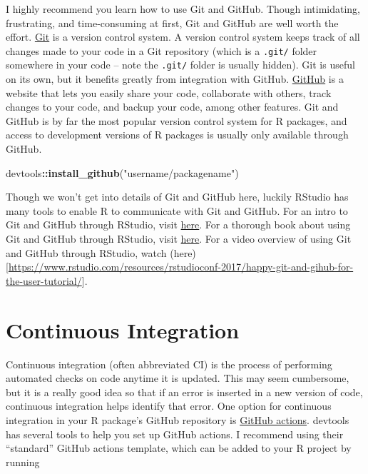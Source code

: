 \documentclass[
]{book}
\newenvironment{Shaded}{\begin{snugshade}}{\end{snugshade}}
\newcommand{\KeywordTok}[1]{\textcolor[rgb]{0.13,0.29,0.53}{\textbf{#1}}}
\newcommand{\NormalTok}[1]{#1}
\newcommand{\OperatorTok}[1]{\textcolor[rgb]{0.81,0.36,0.00}{\textbf{#1}}}
\newcommand{\StringTok}[1]{\textcolor[rgb]{0.31,0.60,0.02}{#1}}
\begin{document}
I highly recommend you learn how to use Git and GitHub. Though intimidating, frustrating, and time-consuming at first, Git and GitHub are well worth the effort. \href{https://git-scm.com/}{Git} is a version control system. A version control system keeps track of all changes made to your code in a Git repository (which is a \texttt{.git/} folder somewhere in your code -- note the \texttt{.git/} folder is usually hidden). Git is useful on its own, but it benefits greatly from integration with GitHub. \href{https://github.com/}{GitHub} is a website that lets you easily share your code, collaborate with others, track changes to your code, and backup your code, among other features. Git and GitHub is by far the most popular version control system for R packages, and access to development versions of R packages is usually only available through GitHub.

\begin{Shaded}
\begin{Highlighting}[]
\NormalTok{devtools}\OperatorTok{::}\KeywordTok{install_github}\NormalTok{(}\StringTok{"username/packagename"}\NormalTok{)}
\end{Highlighting}
\end{Shaded}

Though we won't get into details of Git and GitHub here, luckily RStudio has many tools to enable R to communicate with Git and GitHub. For an intro to Git and GitHub through RStudio, visit \href{https://r-pkgs.org/git.html}{here}. For a thorough book about using Git and GitHub through RStudio, visit \href{https://happygitwithr.com/}{here}. For a video overview of using Git and GitHub through RStudio, watch (here){[}\url{https://www.rstudio.com/resources/rstudioconf-2017/happy-git-and-gihub-for-the-user-tutorial/}{]}.

\hypertarget{continuous-integration}{%
\section{Continuous Integration}\label{continuous-integration}}

Continuous integration (often abbreviated CI) is the process of performing automated checks on code anytime it is updated. This may seem cumbersome, but it is a really good idea so that if an error is inserted in a new version of code, continuous integration helps identify that error. One option for continuous integration in your R package's GitHub repository is \href{https://github.com/features/actions}{GitHub actions}. devtools has several tools to help you set up GitHub actions. I recommend using their ``standard'' GitHub actions template, which can be added to your R project by running
\end{document}
